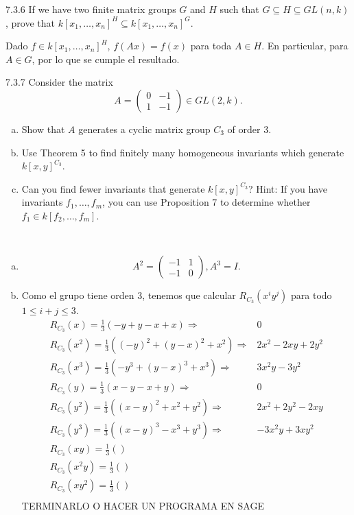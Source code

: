 \documentclass[twoside]{article}
\begin{document}
\begin{ejercicio}{7.3.6}
If we have two finite matrix groups $G$ and $H$ such that $G ⊆ H ⊆ GL(n, k)$, prove that
$k[x_1, \dots , x_n]^H ⊆ k[x_1, \dots , x_n]^G$.
\end{ejercicio}
\begin{solucion}
Dado $f\in k[x_1, \dots , x_n]^H$, $f(Ax)=f(x)$ para toda $A\in H$. En particular, para $A\in G$, por lo que se cumple el resultado.
\end{solucion}
\newpage

\begin{ejercicio}{7.3.7}
Consider the matrix
$$A =
\begin{pmatrix}
0 &−1\\
1 &−1
\end{pmatrix}∈ GL(2, k).$$
\begin{enumerate}[a.]
\item Show that $A$ generates a cyclic matrix group $C_3$ of order 3.
\item Use Theorem 5 to find finitely many homogeneous invariants which generate $k[x, y]^{C_3}$.
\item Can you find fewer invariants that generate $k[x, y]^{C_3}$? Hint: If you have invariants
$f_1, \dots , f_m$, you can use Proposition 7 to determine whether $f_1 ∈ k[ f_2, \dots , f_m]$.
\end{enumerate}
\end{ejercicio}
\begin{solucion}\
\begin{enumerate}[a.]
\item 
\[
A^2=\begin{pmatrix}
-1 & 1\\
-1 & 0
\end{pmatrix}, A^3=I.
\]
\item Como el grupo tiene orden 3, tenemos que calcular $R_{C_3}(x^iy^j)$ para todo $1\leq i+j\leq 3$.
\begin{align*}
R_{C_3}(x)=\frac{1}{3}(-y+y-x+x) \Rightarrow  &0\\
R_{C_3}(x^2)=\frac{1}{3}((-y)^2+(y-x)^2+x^2)\Rightarrow & 2x^2-2xy+2y^2\\
R_{C_3}(x^3)=\frac{1}{3}(-y^3+(y-x)^3+x^3)\Rightarrow & 3x^2y-3y^2\\
R_{C_3}(y)=\frac{1}{3}(x-y-x+y)\Rightarrow & 0\\
R_{C_3}(y^2)=\frac{1}{3}((x-y)^2+x^2+y^2)\Rightarrow & 2x^2+2y^2-2xy\\
R_{C_3}(y^3)=\frac{1}{3}((x-y)^3-x^3+y^3)\Rightarrow &-3x^2y+3xy^2\\
R_{C_3}(xy)=\frac{1}{3}()\\
R_{C_3}(x^2y)=\frac{1}{3}()\\
R_{C_3}(xy^2)=\frac{1}{3}()\\
\end{align*}
TERMINARLO O HACER UN PROGRAMA EN SAGE
\end{enumerate}


\end{solucion}
\newpage
\end{document}

